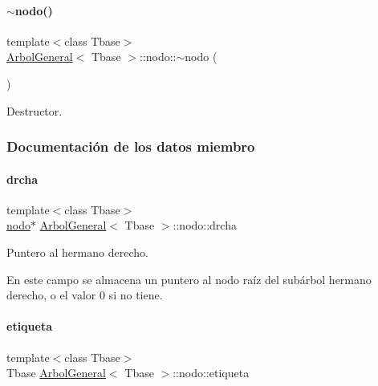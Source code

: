 \paragraph{\texorpdfstring{$\sim$nodo()}{~nodo()}}
{\footnotesize\ttfamily template$<$class Tbase$>$ \\
\hyperlink{classArbolGeneral}{Arbol\+General}$<$ Tbase $>$\+::nodo\+::$\sim$nodo (\begin{DoxyParamCaption}{ }\end{DoxyParamCaption})\hspace{0.3cm}{\ttfamily [inline]}}



Destructor. 



\subsubsection{Documentación de los datos miembro}
\hypertarget{structArbolGeneral_1_1nodo_a8d0a58447171461212942f9308ef4f36}{}\label{structArbolGeneral_1_1nodo_a8d0a58447171461212942f9308ef4f36} 
\paragraph{\texorpdfstring{drcha}{drcha}}
{\footnotesize\ttfamily template$<$class Tbase$>$ \\
\hyperlink{structArbolGeneral_1_1nodo}{nodo}$\ast$ \hyperlink{classArbolGeneral}{Arbol\+General}$<$ Tbase $>$\+::nodo\+::drcha}



Puntero al hermano derecho. 

En este campo se almacena un puntero al nodo raíz del subárbol hermano derecho, o el valor 0 si no tiene. \hypertarget{structArbolGeneral_1_1nodo_ab7223965c5a62aa93895f3decd7a109a}{}\label{structArbolGeneral_1_1nodo_ab7223965c5a62aa93895f3decd7a109a} 
\paragraph{\texorpdfstring{etiqueta}{etiqueta}}
{\footnotesize\ttfamily template$<$class Tbase$>$ \\
Tbase \hyperlink{classArbolGeneral}{Arbol\+General}$<$ Tbase $>$\+::nodo\+::etiqueta}




